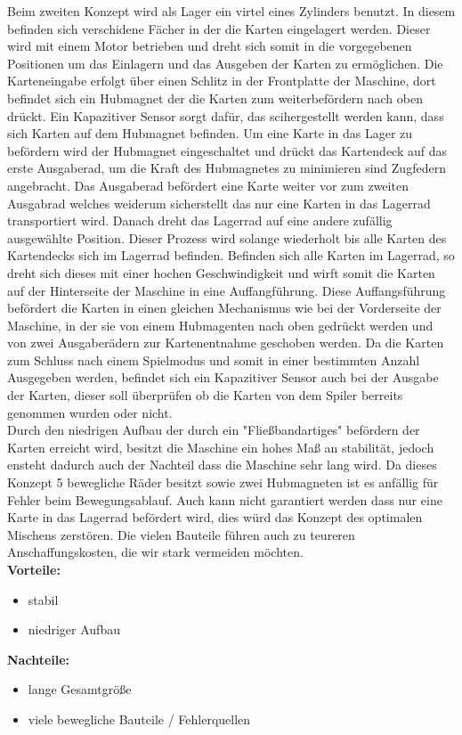 Beim zweiten Konzept wird als Lager ein virtel eines Zylinders benutzt. In diesem befinden
sich verschidene Fächer in der die Karten eingelagert werden. Dieser wird mit einem Motor betrieben
und dreht sich somit in die vorgegebenen Positionen um das Einlagern und das Ausgeben der Karten zu ermöglichen.
Die Karteneingabe erfolgt über einen Schlitz in der Frontplatte der Maschine, dort befindet sich ein Hubmagnet der die Karten
zum weiterbefördern nach oben drückt. Ein Kapazitiver Sensor sorgt dafür, das scihergestellt werden kann, dass sich Karten auf dem Hubmagnet befinden.
Um eine Karte in das Lager zu befördern wird der Hubmagnet eingeschaltet und drückt das Kartendeck auf das erste Ausgaberad, um die Kraft des Hubmagnetes zu minimieren sind Zugfedern angebracht.
Das Ausgaberad befördert eine Karte weiter vor zum zweiten Ausgabrad welches weiderum sicherstellt das nur eine Karten in das Lagerrad transportiert wird.
Danach dreht das Lagerrad auf eine andere zufällig ausgewählte Position. Dieser Prozess wird solange wiederholt bis alle Karten des Kartendecks sich im Lagerrad befinden.
Befinden sich alle Karten im Lagerrad, so dreht sich dieses mit einer hochen Geschwindigkeit und wirft somit die Karten auf der Hinterseite der Maschine in eine Auffangführung. %
Diese Auffangsführung befördert die Karten in einen gleichen Mechanismus wie bei der Vorderseite der Maschine, in der sie von einem Hubmagenten nach oben gedrückt werden und von zwei Ausgaberädern zur
Kartenentnahme geschoben werden. Da die Karten zum Schluss nach einem Spielmodus und somit in einer bestimmten Anzahl Ausgegeben werden, befindet sich ein Kapazitiver Sensor auch bei der Ausgabe der Karten,
dieser soll überprüfen ob die Karten von dem Spiler berreits genommen wurden oder nicht.\\

Durch den niedrigen Aufbau der durch ein "Fließbandartiges" befördern der Karten erreicht wird, besitzt die Maschine ein hohes Maß an stabilität, jedoch ensteht dadurch auch der Nachteil
dass die Maschine sehr lang wird. Da dieses Konzept 5 bewegliche Räder besitzt sowie zwei Hubmagneten ist es anfällig für Fehler beim Bewegungsablauf. Auch kann nicht garantiert werden
dass nur eine Karte in das Lagerrad befördert wird, dies würd das Konzept des optimalen Mischens zerstören. Die vielen Bauteile führen auch zu teureren Anschaffungskosten, die wir stark vermeiden möchten.\\

\textbf{Vorteile:}
\begin{itemize}
    \item stabil
    \item niedriger Aufbau
\end{itemize}
\textbf{Nachteile:}
\begin{itemize}
    \item lange Gesamtgröße
    \item viele bewegliche Bauteile / Fehlerquellen
\end{itemize}

